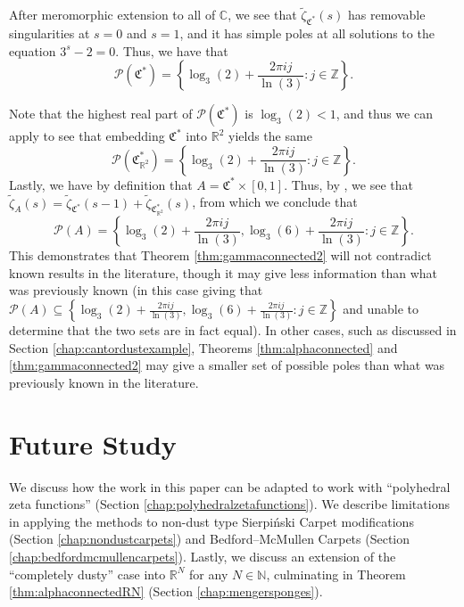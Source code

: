 \documentclass{article}
\theoremstyle{plain}
\numberwithin{equation}{section}
\numberwithin{table}{section}
\numberwithin{figure}{section}
\begin{document}
After meromorphic extension to all of $\mathbb{C}$, we see that $\tilde{\zeta}_{\mathfrak{C}^*}(s)$ has removable singularities at $s = 0$ and $s = 1$, and it has simple poles at all solutions to the equation $3^s - 2 = 0$. Thus, we have that
\begin{equation}
\mathscr{P}(\mathfrak{C}^*) = \left\{\log_3(2) + \frac{2\pi i j}{\ln(3)} : j \in \mathbb{Z}\right\}.
\end{equation}

Note that the highest real part of $\mathscr{P}(\mathfrak{C}^*)$ is $\log_3(2) < 1$, and thus we can apply \cite[Theorem 4.7.3]{lapidusbook} to see that embedding $\mathfrak{C}^*$ into $\mathbb{R}^2$ yields the same
\begin{equation}
\mathscr{P}\left(\mathfrak{C}_{\mathbb{R}^2}^*\right) = \left\{\log_3(2) + \frac{2\pi i j}{\ln(3)} : j \in \mathbb{Z}\right\}.
\end{equation}
Lastly, we have by definition that $A = \mathfrak{C}^* \times [0,1]$. Thus, by \cite[Lemma 2.2.31]{lapidusbook}, we see that $\tilde{\zeta}_A(s) = \tilde{\zeta}_{\mathfrak{C}^*}(s-1) + \tilde{\zeta}_{\mathfrak{C}_{\mathbb{R}^2}^*}(s)$, from which we conclude that
\begin{equation}
\mathscr{P}(A) = \left\{\log_3(2) + \frac{2\pi i j}{\ln(3)}, \log_3(6) + \frac{2\pi i j}{\ln(3)} : j \in \mathbb{Z}\right\}.
\end{equation}
This demonstrates that Theorem \ref{thm:gammaconnected2} will not contradict known results in the literature, though it may give less information than what was previously known (in this case giving that $\mathscr{P}(A) \subseteq \left\{\log_3(2) + \frac{2\pi i j}{\ln(3)}, \log_3(6) + \frac{2\pi i j}{\ln(3)} : j \in \mathbb{Z}\right\}$ and unable to determine that the two sets are in fact equal). In other cases, such as discussed in Section \ref{chap:cantordustexample}, Theorems \ref{thm:alphaconnected} and \ref{thm:gammaconnected2} may give a smaller set of possible poles than what was previously known in the literature.







\section{Future Study} \label{chap:futurestudy}
We discuss how the work in this paper can be adapted to work with ``polyhedral zeta functions'' (Section \ref{chap:polyhedralzetafunctions}). We describe limitations in applying the methods to non-dust type Sierpi\'nski Carpet modifications (Section \ref{chap:nondustcarpets}) and Bedford--McMullen Carpets (Section \ref{chap:bedfordmcmullencarpets}). Lastly, we discuss an extension of the ``completely dusty'' case into $\mathbb{R}^N$ for any $N \in \mathbb{N}$, culminating in Theorem \ref{thm:alphaconnectedRN} (Section \ref{chap:mengersponges}).
\end{document}
